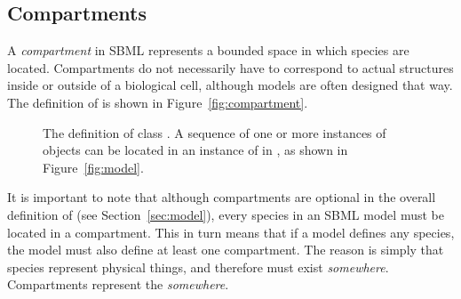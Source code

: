 \subsection{Compartments}
\label{sec:compartments}

A \emph{compartment} in SBML represents a bounded space in which
species are located.  Compartments do not necessarily have to
correspond to actual structures inside or outside of a biological
cell, although models are often designed that way.  The definition
of \Compartment is shown in Figure~\vref{fig:compartment}.

\begin{figure}[htb]
  \centering
  \small
  \vspace*{-1ex}
  \caption{The definition of class \Compartment.  A
      sequence of one or more instances of \Compartment objects
      can be located in an instance of \ListOfCompartments in
      \Model, as shown in Figure~\protect\ref{fig:model}.}
  \label{fig:compartment}
\end{figure}

It is important to note that although compartments are optional in
the overall definition of \Model (see Section~\ref{sec:model}),
every species in an SBML model must be located in a compartment.
This in turn means that if a model defines any species, the model
must also define at least one compartment.  The reason is simply
that species represent physical things, and therefore must exist
\emph{somewhere}.  Compartments represent the \emph{somewhere}.


